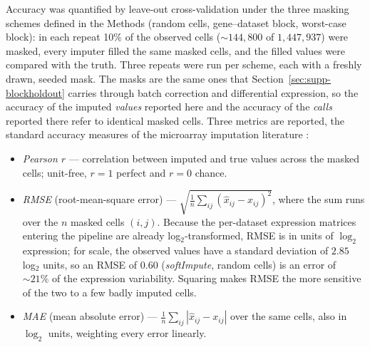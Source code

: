 \documentclass[11pt,a4paper]{article}
\begin{document}
Accuracy was quantified by leave-out cross-validation
under the three masking schemes defined in the Methods
(random cells, gene--dataset block, worst-case block): in each
repeat 10\% of the observed cells (${\sim}144{,}800$ of
$1{,}447{,}937$) were masked, every imputer filled the same
masked cells, and the filled values were compared with the
truth. Three repeats were run per scheme, each with a freshly
drawn, seeded mask. The masks are the same ones that
Section~\ref{sec:supp-blockholdout} carries through batch
correction and differential expression, so the accuracy of the
imputed \emph{values} reported here and the accuracy of the
\emph{calls} reported there refer to identical masked cells.
Three metrics are reported, the standard accuracy measures of
the microarray imputation literature \citep{Troyanskaya2001}:
\begin{itemize}
  \item \emph{Pearson $r$} --- correlation between imputed and
    true values across the masked cells; unit-free, $r = 1$
    perfect and $r = 0$ chance.
  \item \emph{RMSE} (root-mean-square error) ---
    $\sqrt{\frac{1}{n}\sum_{ij}(\hat x_{ij} - x_{ij})^2}$,
    where the sum runs over the $n$ masked cells $(i,j)$.
    Because the per-dataset expression matrices entering the
    pipeline are already log$_2$-transformed, RMSE is in units
    of $\log_2$ expression; for scale, the observed values have
    a standard deviation of $2.85$ log$_2$ units, so an RMSE of
    $0.60$ (\textit{softImpute}, random cells) is an error of
    ${\sim}21\%$ of the expression variability. Squaring makes RMSE the more sensitive of the
    two to a few badly imputed cells.
  \item \emph{MAE} (mean absolute error) ---
    $\frac{1}{n}\sum_{ij}|\hat x_{ij} - x_{ij}|$ over the same
    cells, also in $\log_2$ units, weighting every error
    linearly.
\end{itemize}
\end{document}
